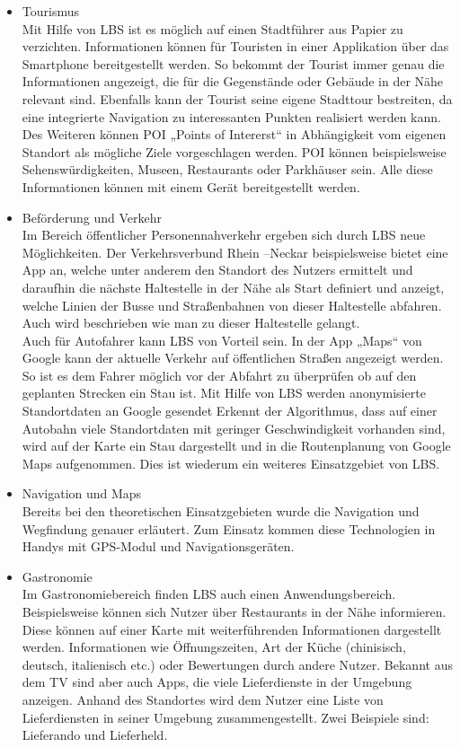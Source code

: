 \begin{itemize}
	\item Tourismus\\
	Mit Hilfe von LBS ist es möglich auf einen Stadtführer aus Papier zu verzichten. Informationen können für Touristen in einer Applikation über das Smartphone bereitgestellt werden. So bekommt der Tourist immer genau die Informationen angezeigt, die für die Gegenstände oder Gebäude in der Nähe relevant sind. Ebenfalls kann der Tourist seine eigene Stadttour bestreiten, da eine integrierte Navigation zu interessanten Punkten realisiert werden kann. Des Weiteren können POI „Points of Intererst“ in Abhängigkeit vom eigenen Standort als mögliche Ziele vorgeschlagen werden. POI können beispielsweise Sehenswürdigkeiten, Museen, Restaurants oder Parkhäuser sein.
Alle diese Informationen können mit einem Gerät bereitgestellt werden.

	\item Beförderung und Verkehr\\
	Im Bereich öffentlicher Personennahverkehr ergeben sich durch LBS neue Möglichkeiten. Der Verkehrsverbund Rhein –Neckar beispielsweise bietet eine App an, welche unter anderem den Standort des Nutzers ermittelt und daraufhin die nächste Haltestelle in der Nähe als Start definiert und anzeigt, welche Linien der Busse und Straßenbahnen von dieser Haltestelle abfahren. Auch wird beschrieben wie man zu dieser Haltestelle gelangt.
\\Auch für Autofahrer kann LBS von Vorteil sein. In der App „Maps“ von Google kann der aktuelle Verkehr auf öffentlichen Straßen angezeigt werden. So ist es dem Fahrer möglich vor der Abfahrt zu überprüfen ob auf den geplanten Strecken ein Stau ist. Mit Hilfe von LBS werden anonymisierte Standortdaten an Google gesendet Erkennt der Algorithmus, dass auf einer Autobahn viele Standortdaten mit geringer Geschwindigkeit vorhanden sind, wird auf der Karte ein Stau dargestellt und in die Routenplanung von Google Maps aufgenommen. Dies ist wiederum ein weiteres Einsatzgebiet von LBS. \cite{StauWarnung}

	
	\item Navigation und Maps\\
	Bereits bei den theoretischen Einsatzgebieten wurde die Navigation und Wegfindung genauer erläutert. Zum Einsatz kommen diese Technologien in Handys mit GPS-Modul und Navigationsgeräten. 
	
	\item Gastronomie\\
	Im Gastronomiebereich finden LBS auch einen Anwendungsbereich. Beispielsweise können sich Nutzer über Restaurants in der Nähe informieren. Diese können auf einer Karte mit weiterführenden Informationen dargestellt werden.  Informationen wie Öffnungszeiten, Art der Küche (chinisisch, deutsch, italienisch etc.) oder Bewertungen durch andere Nutzer.
Bekannt aus dem TV sind aber auch Apps, die viele Lieferdienste in der Umgebung anzeigen. Anhand des Standortes wird dem Nutzer eine Liste von Lieferdiensten in seiner Umgebung zusammengestellt. Zwei Beispiele sind: Lieferando und Lieferheld.


\end{itemize}
